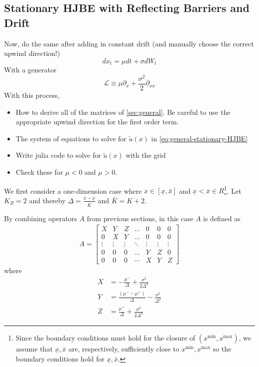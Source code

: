 \documentclass[11pt]{article}
\newcommand{\D}[1][]{\ensuremath{\partial_{#1}}}
\begin{document}
\subsection{Stationary HJBE with Reflecting Barriers and Drift}
Now, do the same after adding in constant drift (and manually choose the correct upwind direction!)
$$
d x_t = \mu dt + \sigma d W_t
$$
With a generator
$$
	\mathcal{L} \equiv \mu \D[x] + \frac{\sigma^2}{2}\D[xx]
$$
With this process,
\begin{itemize}
	\item How to derive all of the matrices of \cref{sec:general}.  Be careful to use the appropriate upwind direction for the first order term.
	\item The system of equations to solve for $\tilde{u}(x)$ in \cref{eq:general-stationary-HJBE}
	\item Write julia code to solve for $\tilde{u}(x)$ with the grid
	\item Check these for $\mu < 0$ and $\mu > 0$.
\end{itemize}

We first consider a one-dimension case where $x\in [\underline{\textit{\~{x}}}, \bar{\textit{\~{x}}}]$ and $\underline{\textit{\~{x}}} < \bar{\textit{\~{x}}} \in R$\footnote{Since the boundary conditions must hold for the closure of $(x^{\min},x^{\max})$, we assume that $\underline{\textit{\~{x}}}, \bar{\textit{\~{x}}}$ are, respectively, sufficiently close to $x^{\min}, x^{\max}$ so the boundary conditions hold for $\underline{\textit{\~{x}}}, \bar{\textit{\~{x}}}$.}. Let $K_B = 2$ and thereby $\Delta  = \frac{\bar{\textit{\~{x}}} - \underline{\textit{\~{x}}}}{\bar{K}}$ and $\bar{K} = K+2$.

By combining operators $A $ from previous sections, in this case $A $ is defined as
\begin{align}
A = \begin{bmatrix}
X&Y&Z&\dots&0&0&0\\
0&X&Y&\dots&0&0&0\\
\vdots&\vdots&\vdots&\ddots&\vdots&\vdots&\vdots\\
0&0&0&\dots&Y&Z&0\\
0&0&0&\cdots&X&Y&Z
\end{bmatrix}
\end{align}
where
\begin{align*}
X &= -\frac{\mu^-}{\Delta}+\frac{\sigma^2}{2\Delta^2}\\
Y &= \frac{(\mu^--\mu^+)}{\Delta}-\frac{\sigma^2}{\Delta^2}\\
Z &=\frac{\mu^+}{\Delta}+\frac{\sigma^2}{2\Delta^2}
\end{align*}
\end{document}
